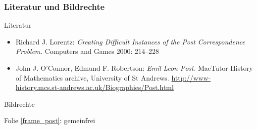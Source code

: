 \documentclass[aspectratio=1610,onlymath]{beamer}
\begin{document}
\begin{frame}[t]\frametitle{Literatur und Bildrechte}

\alert{Literatur}\bigskip

\begin{itemize}
\item Richard J. Lorentz:
\emph{Creating Difficult Instances of the Post Correspondence Problem.}
Computers and Games 2000: 214--228
\item John J. O'Connor, Edmund F. Robertson: \emph{Emil Leon Post.} MacTutor History of Mathematics archive, University of St Andrews. \url{http://www-history.mcs.st-andrews.ac.uk/Biographies/Post.html}
\end{itemize}

\bigskip\bigskip

\alert{Bildrechte}\bigskip

Folie \ref{frame_post}: gemeinfrei

\end{frame}
\end{document}
